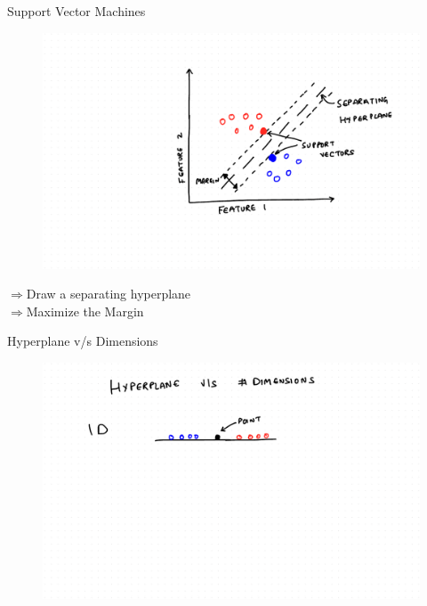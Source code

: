 \documentclass{beamer}
\begin{document}
\begin{frame}{Support Vector Machines}
\begin{figure}
\begin{overprint}
    \includegraphics[scale = 0.3]{SVM/Svm-4.pdf}
    
    \end{overprint}
\end{figure}


{
  $\Rightarrow$Draw a separating hyperplane\\
 
}
{
  $\Rightarrow$Maximize the Margin
}

\end{frame}

\begin{frame}{Hyperplane v/s Dimensions}
\begin{figure}
    \includegraphics[width=\linewidth]{./SVM/Svm-5.pdf}  
\end{figure}
\end{frame}
\end{document}
